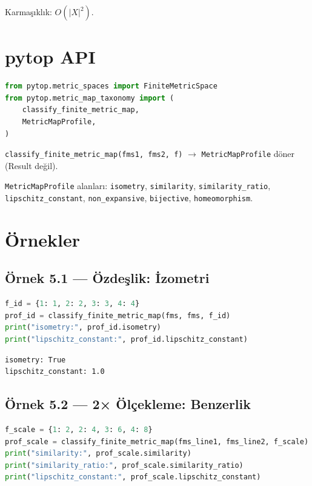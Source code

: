 Karmaşıklık: $O(|X|^2)$.

\section{pytop API}

\begin{lstlisting}[language=Python]
from pytop.metric_spaces import FiniteMetricSpace
from pytop.metric_map_taxonomy import (
    classify_finite_metric_map,
    MetricMapProfile,
)
\end{lstlisting}

\texttt{classify\_finite\_metric\_map(fms1, fms2, f)} $\to$ \texttt{MetricMapProfile} döner (Result değil).

\texttt{MetricMapProfile} alanları: \texttt{isometry}, \texttt{similarity}, \texttt{similarity\_ratio},
\texttt{lipschitz\_constant}, \texttt{non\_expansive}, \texttt{bijective}, \texttt{homeomorphism}.

\section{Örnekler}

\subsection*{Örnek 5.1 — Özdeşlik: İzometri}

\begin{lstlisting}[language=Python]
f_id = {1: 1, 2: 2, 3: 3, 4: 4}
prof_id = classify_finite_metric_map(fms, fms, f_id)
print("isometry:", prof_id.isometry)
print("lipschitz_constant:", prof_id.lipschitz_constant)
\end{lstlisting}

\begin{verbatim}
isometry: True
lipschitz_constant: 1.0
\end{verbatim}

\subsection*{Örnek 5.2 — 2× Ölçekleme: Benzerlik}

\begin{lstlisting}[language=Python]
f_scale = {1: 2, 2: 4, 3: 6, 4: 8}
prof_scale = classify_finite_metric_map(fms_line1, fms_line2, f_scale)
print("similarity:", prof_scale.similarity)
print("similarity_ratio:", prof_scale.similarity_ratio)
print("lipschitz_constant:", prof_scale.lipschitz_constant)
\end{lstlisting}


